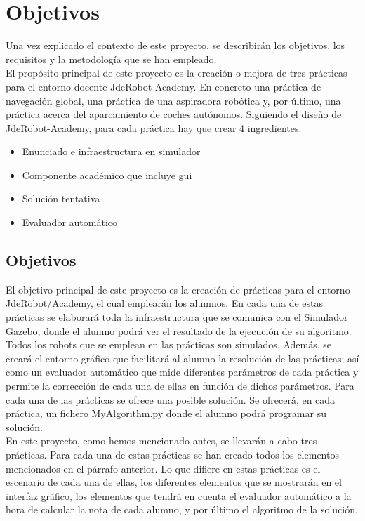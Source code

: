 \chapter{Objetivos}\label{cap.objetivos}
Una vez explicado el contexto de este proyecto, se describirán los objetivos, los requisitos y la metodología que se han empleado.\\

El propósito principal de este proyecto es la creación o mejora de tres prácticas para el entorno docente JdeRobot-Academy. En concreto una práctica de navegación global, una práctica de una aspiradora robótica y, por último, una práctica acerca del aparcamiento de coches autónomos. Siguiendo el diseño de JdeRobot-Academy, para cada práctica hay que crear 4 ingredientes:

\begin{itemize}
\item Enunciado e infraestructura en simulador
\item Componente académico que incluye \acrshort{gui}
\item Solución tentativa
\item Evaluador automático
\end{itemize}

\section{Objetivos}
El objetivo principal de este proyecto es la creación de prácticas para el entorno JdeRobot/Academy, el cual emplearán los alumnos. En cada una de estas prácticas se elaborará toda la infraestructura que se comunica con el Simulador Gazebo, donde el alumno podrá ver el resultado de la ejecución de su algoritmo. Todos los robots que se emplean en las prácticas son simulados. Además, se creará el entorno gráfico que facilitará al alumno la resolución de las prácticas; así como un evaluador automático que mide diferentes parámetros de cada práctica y permite la corrección de cada una de ellas en función de dichos parámetros. Para cada una de las prácticas se ofrece una posible solución. Se ofrecerá, en cada práctica, un fichero MyAlgorithm.py donde el alumno podrá programar su solución.\\

En este proyecto, como hemos mencionado antes, se llevarán a cabo tres prácticas. Para cada una de estas prácticas se han creado todos los elementos mencionados en el párrafo anterior. Lo que difiere en estas prácticas es el escenario de cada una de ellas, los diferentes elementos que se mostrarán en el interfaz gráfico, los elementos que tendrá en cuenta el evaluador automático a la hora de calcular la nota de cada alumno, y por último el algoritmo de la solución.\\

